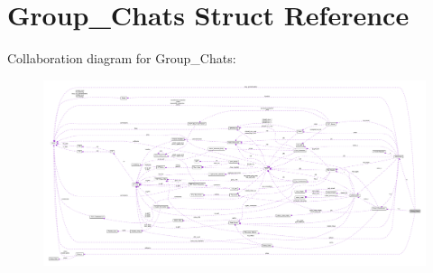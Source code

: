 \hypertarget{struct_group___chats}{\section{Group\+\_\+\+Chats Struct Reference}
\label{struct_group___chats}
}


Collaboration diagram for Group\+\_\+\+Chats\+:
\nopagebreak
\begin{figure}[H]
\begin{center}
\leavevmode
\includegraphics[width=350pt]{struct_group___chats__coll__graph}
\end{center}
\end{figure}
